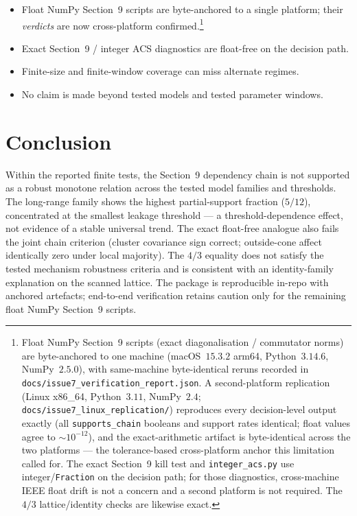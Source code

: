 \documentclass[11pt]{article}
\begin{document}
\begin{itemize}[leftmargin=1.4em,itemsep=2pt]
  \item Float NumPy Section~9 scripts are byte-anchored to a single
        platform; their \emph{verdicts} are now cross-platform
        confirmed.\footnote{Float NumPy Section~9 scripts (exact
        diagonalisation / commutator norms) are byte-anchored to one machine
        (macOS~$15.3.2$ arm64, Python~$3.14.6$, NumPy~$2.5.0$), with
        same-machine byte-identical reruns recorded in
        \nolinkurl{docs/issue7_verification_report.json}.  A second-platform
        replication (Linux x86\_64, Python~$3.11$, NumPy~$2.4$;
        \nolinkurl{docs/issue7_linux_replication/}) reproduces every
        decision-level output exactly (all \texttt{supports\_chain}
        booleans and support rates identical; float values agree to
        $\sim\!10^{-12}$), and the exact-arithmetic artifact is
        byte-identical across the two platforms --- the tolerance-based
        cross-platform anchor this limitation called for.
        The exact Section~9 kill test and
        \texttt{integer\_acs.py} use integer/\texttt{Fraction} on the
        decision path; for those diagnostics, cross-machine IEEE float
        drift is not a concern and a second platform is not required.
        The $4/3$ lattice/identity checks are likewise exact.}
  \item Exact Section~9 / integer ACS diagnostics are float-free on the
        decision path.
  \item Finite-size and finite-window coverage can miss alternate regimes.
  \item No claim is made beyond tested models and tested parameter windows.
\end{itemize}

\section{Conclusion}

Within the reported finite tests, the Section~9 dependency chain is not
supported as a robust monotone relation across the tested model families
and thresholds.  The long-range family shows the highest partial-support
fraction ($5/12$), concentrated at the smallest leakage threshold --- a
threshold-dependence effect, not evidence of a stable universal trend.
The exact float-free analogue also fails the joint chain criterion
(cluster covariance sign correct; outside-cone affect identically zero
under local majority).  The $4/3$ equality does not satisfy the tested
mechanism robustness criteria and is consistent with an identity-family
explanation on the scanned lattice.  The package is reproducible
in-repo with anchored artefacts; end-to-end verification retains caution
only for the remaining float NumPy Section~9 scripts.
\end{document}
